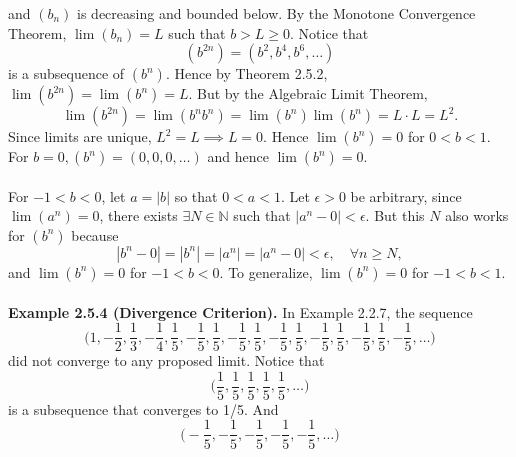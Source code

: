 \documentclass{article}
\begin{document}
                and $(b_n)$ is decreasing and bounded below. By the Monotone Convergence Theorem, $\lim(b_n)=L$ such that $b>L\geq 0$. Notice that 
                \begin{equation*}
                    (b^{2n}) = (b^2,b^4,b^6,\dots)
                \end{equation*}
                is a subsequence of $(b^n)$. Hence by Theorem 2.5.2, $\lim(b^{2n})=\lim(b^n)=L$. But by the Algebraic Limit Theorem,
                \begin{equation*}
                    \lim(b^{2n})=\lim(b^nb^n)=\lim(b^n)\lim(b^n)=L \cdot L=L^2.
                \end{equation*}
                Since limits are unique, $L^2=L \implies L=0$. Hence $\lim(b^n)=0$ for $0<b<1$. For $b=0,(b^n)=(0,0,0,\dots)$ and hence $\lim(b^n)=0$.\\ \\
                For $-1<b<0$, let $a=|b|$ so that $0<a<1$. Let $\epsilon>0$ be arbitrary, since $\lim(a^n)=0$, there exists $\exists N \in \mathbb{N}$ such that $|a^n-0|<\epsilon$. But this $N$ also works for $(b^n)$ because
                \begin{equation*}
                    |b^n-0|=|b^n|=|a^n|=|a^n-0|<\epsilon, \quad \forall n \geq N,
                \end{equation*}
                and $\lim(b^n)=0$ for $-1<b<0$. To generalize, $\lim(b^n)=0$ for $-1<b<1$.\\ \\
                \textbf{Example 2.5.4 (Divergence Criterion).} In Example 2.2.7, the sequence 
                \begin{equation*}
                    \bigg(1, -\frac{1}{2}, \frac{1}{3}, -\frac{1}{4}, \frac{1}{5}, -\frac{1}{5}, \frac{1}{5}, -\frac{1}{5}, \frac{1}{5}, -\frac{1}{5}, \frac{1}{5}, -\frac{1}{5}, \frac{1}{5}, -\frac{1}{5}, \frac{1}{5}, -\frac{1}{5}, \dots\bigg)
                \end{equation*}
                did not converge to any proposed limit. Notice that
                \begin{equation*}
                    \bigg(\frac{1}{5}, \frac{1}{5}, \frac{1}{5}, \frac{1}{5}, \frac{1}{5}, \dots\bigg)
                \end{equation*}
                is a subsequence that converges to 1/5. And 
                \begin{equation*}
                    \bigg(-\frac{1}{5}, -\frac{1}{5}, -\frac{1}{5}, -\frac{1}{5}, -\frac{1}{5}, \dots\bigg)
                \end{equation*}
\end{document}
